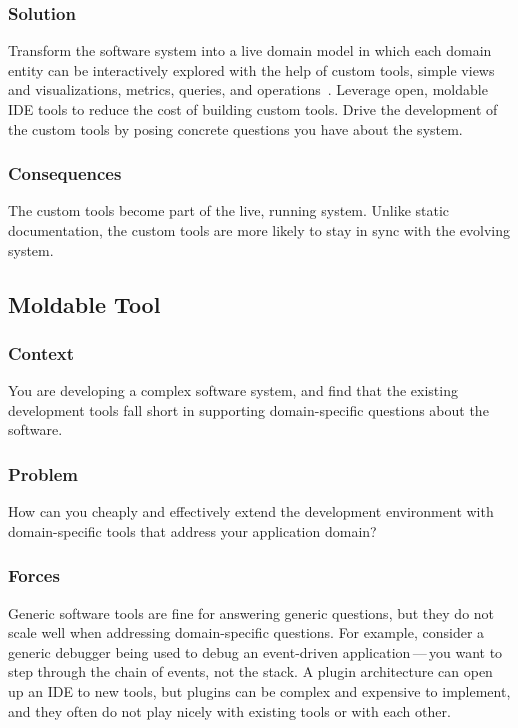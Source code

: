 \documentclass[sigconf]{acmart}
\begin{document}
\subsubsection*{Solution}
Transform the software system into a live domain model in which each domain entity can be interactively explored with the help of custom tools, \ie simple views and visualizations, metrics, queries, and operations~\cite{Nier22a}.
Leverage open, moldable IDE tools to reduce the cost of building custom tools.
Drive the development of the custom tools by posing concrete questions you have about the system.

\subsubsection*{Consequences}
The custom tools become part of the live, running system.
Unlike static documentation, the custom tools are more likely to stay in sync with the evolving system.

\subsection*{Moldable Tool}\label{pat:moldableTool}

\subsubsection*{Context}
You are developing a complex software system, and find that the existing development tools fall short in supporting domain-specific questions about the software.

\subsubsection*{Problem}
How can you cheaply and effectively extend the development environment with domain-specific tools that address your application domain?

\subsubsection*{Forces}
Generic software tools are fine for answering generic questions, but they do not scale well when addressing domain-specific questions.
For example, consider a generic debugger being used to debug an event-driven application\,---\,you want to step through the chain of events, not the stack.
A plugin architecture can open up an IDE to new tools, but plugins can be complex and expensive to implement, and they often do not play nicely with existing tools or with each other.
\end{document}
